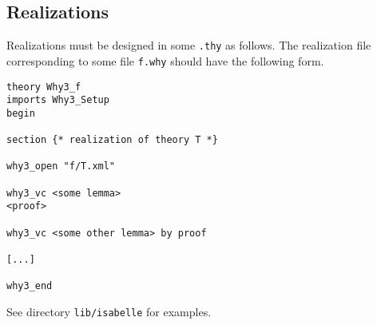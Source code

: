 \subsection{Realizations}

Realizations must be designed in some \texttt{.thy} as follows.
The realization file corresponding to some \why file \texttt{f.why}
should have the following form.
\begin{verbatim}
theory Why3_f
imports Why3_Setup
begin

section {* realization of theory T *}

why3_open "f/T.xml"

why3_vc <some lemma>
<proof>

why3_vc <some other lemma> by proof

[...]

why3_end
\end{verbatim}

See directory \texttt{lib/isabelle} for examples.


